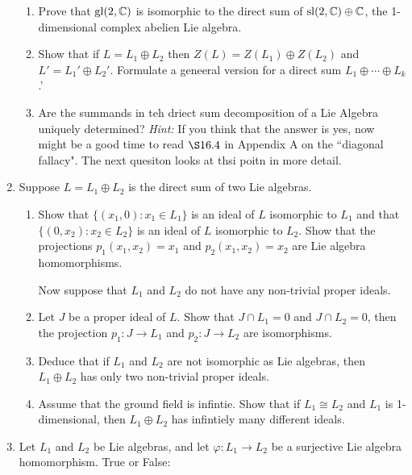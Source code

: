 \documentclass[12pt,a4paper]{report}
\newcommand{\GL}{\operatorname{gl}}
\newcommand{\SL}{\operatorname{sl}}
\begin{document}
\begin{enumerate}[label=2.\arabic*]
\begin{enumerate}[label=(\roman*)]
	\item Prove that $\GL(2,\C)$ is isomorphic to the direct sum of $\SL(2,\C) \oplus \C$, the 1-dimensional complex abelien Lie algebra.
	
	\item Show that if $L=L_1 \oplus L_2$ then $Z(L)=Z(L_1)\oplus Z(L_2)$ and $L'=L_1'\oplus L_2'$.  Formulate a geneeral version for a direct sum $L_1\oplus \cdots \oplus L_k$.'
	
	\item Are the summands in teh driect sum decomposition of a Lie Algebra uniquely determined?  \textit{Hint: } If you think that the answer is yes, now might be a good time to read $\S 16.4$ in Appendix A on the ``diagonal fallacy".  The next quesiton looks at thsi poitn in more detail.

\end{enumerate}

\item Suppose $L=L_1 \oplus L_2$ is the direct sum of two Lie algebras.
\begin{enumerate}[label=(\roman*)]

	\item Show that $\{(x_1,0):x_1 \in L_1\}$ is an ideal of $L$ isomorphic to $L_1$ and that $\{(0,x_2):x_2\in L_2\}$ is an ideal of $L$ isomorphic to $L_2$.  Show that the projections $p_1(x_1,x_2) = x_1$ and $p_2(x_1,x_2)=x_2$ are Lie algebra homomorphisms.
	
	Now suppose that $L_1$ and $L_2$ do not have any non-trivial proper ideals.
	
	\item Let $J$ be a  proper ideal of $L$. Show that $J \cap L_1 =0$ and $J\cap L_2= 0$, then the projection $p_1:J \to L_1$ and $p_2: J\to L_2$ are isomorphisms.
	
	\item Deduce that if $L_1$ and $L_2$ are not isomorphic as Lie algebras, then $L_1\oplus L_2$ has only two non-trivial proper ideals.
	
	\item Assume that the ground field is infintie.  Show that if $L_1 \cong L_2$ and  $L_1$ is 1-dimensional, then $L_1\oplus L_2$ has infintiely many different ideals.

\end{enumerate}

\item Let $L_1$ and $L_2$ be Lie algebras, and let $\varphi : L_1\to L_2$ be a surjective Lie algebra homomorphism.  True or False:
\begin{enumerate}[label=(\alph*)]


\end{enumerate}
\end{enumerate}
\end{document}
